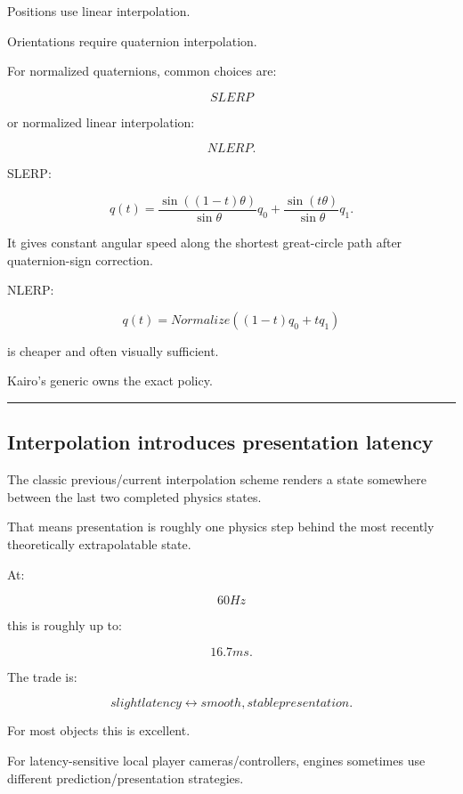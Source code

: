 Positions use linear interpolation.

Orientations require quaternion interpolation.

For normalized quaternions, common choices are:

\[
SLERP
\]

or normalized linear interpolation:

\[
NLERP.
\]

SLERP:

\[
q(t)
=
\frac{
\sin((1-t)\theta)
}{
\sin\theta
}q_0
+
\frac{
\sin(t\theta)
}{
\sin\theta
}q_1.
\]

It gives constant angular speed along the shortest great-circle path after quaternion-sign correction.

NLERP:

\[
q(t)
=
Normalize(
(1-t)q_0+tq_1
)
\]

is cheaper and often visually sufficient.

Kairo's generic  owns the exact policy.

\begin{center}\rule{0.5\linewidth}{0.5pt}\end{center}

\subsection{Interpolation introduces presentation latency}\label{06-engine-ii-ch037-interpolation-introduces-presentation-latency}

\hypertarget{06-engine-ii-ch037-interpolation-introduces-presentation-latency}{}

The classic previous/current interpolation scheme renders a state somewhere between the last two completed physics states.

That means presentation is roughly one physics step behind the most recently theoretically extrapolatable state.

At:

\[
60Hz
\]

this is roughly up to:

\[
16.7ms.
\]

The trade is:

\[
\boxed{
slight latency
\leftrightarrow
smooth, stable presentation.
}
\]

For most objects this is excellent.

For latency-sensitive local player cameras/controllers, engines sometimes use different prediction/presentation strategies.

